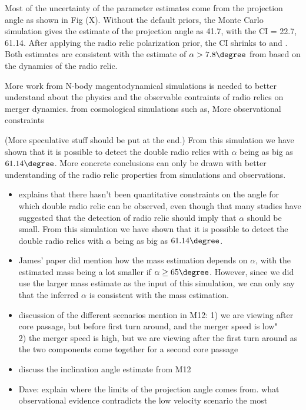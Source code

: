 Most of the uncertainty of the parameter estimates come from the projection
angle as shown in Fig (X).
Without the default priors, the Monte Carlo simulation gives the estimate
of the projection angle as 41.7\degree, with the CI = 22.7\degree, 61.14\degree.  
After applying the radio relic polarization prior, the CI shrinks to 
\degree and \degree.
Both estimates are consistent with the estimate of $\alpha > 7.8 \degree$ from
\citet{L13} based on the dynamics of the radio relic. 

More work from N-body magentodynamical simulations is needed to better understand about the physics and the
observable contraints of
radio relics on merger dynamics. from cosmological simulations such as,  
More observational constraints  

(More speculative stuff should be put at the end.)
From this simulation we have shown that it is possible to detect
the double radio relics with $\alpha$ being as big as $61.14\degree$. 
More concrete conclusions can only be drawn with better understanding of
the radio relic properties from simulations and observations. 


\begin{itemize}
\item explains that there hasn't been quantitative constraints on the angle
for which double radio relic can be observed, even though that many studies
have suggested that the detection of radio relic should imply that $\alpha$
should be small. 
From this simulation we have shown that it is possible to detect
the double radio relics with $\alpha$ being as big as $61.14\degree$. 

\item James' paper did mention how the mass estimation depends on $\alpha$,
with the estimated mass being a lot smaller if $\alpha \ge 65\degree$. 
However, since we did use the larger mass estimate as the input of this
simulation, we can only say that the inferred $\alpha$ is consistent with
the mass estimation. 
\item discussion of the different scenarios mention in M12:
1) we are viewing after core passage, but before first turn around, and
the merger speed is low"\\
2) the merger speed is high, but we are viewing after the first turn
around as the two components come together for a second core passage
\item discuss the inclination angle estimate from M12
\item Dave: explain where the limits of the projection angle comes
from. what observational evidence contradicts the low velocity
scenario the most
\end{itemize}

